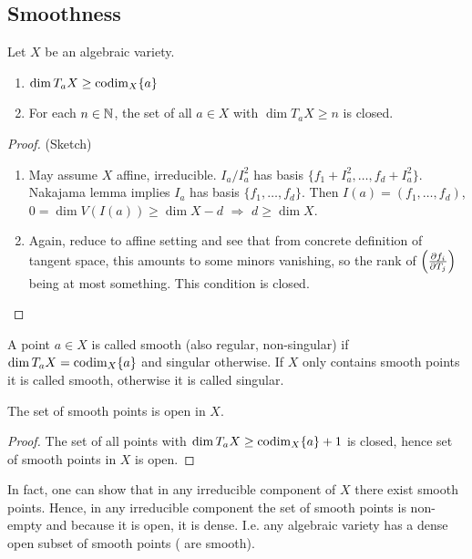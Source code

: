 \documentclass[a4paper,11pt]{article}
\begin{document}
		\subsection{Smoothness}

			\begin{prop}\label{prop--smoothness}
				Let $X$ be an algebraic variety.
				\begin{enumerate}
					\item $\dim T_aX\ge\operatorname{codim}_X\{a\}$
					\item For each $n\in\mathbb{N}$, the set of all $a\in X$ with $\dim T_aX\ge n$ is closed.
				\end{enumerate}
			\end{prop}
			\begin{proof}
				(Sketch)
				\begin{enumerate}
					\item May assume $X$ affine, irreducible. $I_a/I_a^2$ has basis $\{f_1+I_a^2,\dots,f_d+I_a^2\}$. Nakajama lemma implies $I_a$ has basis $\{f_1,\dots,f_d\}$. Then $I(a)=(f_1,\dots,f_d)$, $0=\dim V(I(a))\ge\dim X-d$ $\Longrightarrow$ $d\ge\dim X$.
					\item Again, reduce to affine setting and see that from concrete definition of tangent space, this amounts to some minors vanishing, so the rank of $\left(\frac{\partial f_i}{\partial T_j}\right)$ being at most something. This condition is closed.
				\end{enumerate}
			\end{proof}

			\begin{defi}
				A point $a\in X$ is called smooth (also regular, non-singular) if $\dim T_aX=\operatorname{codim}_X\{a\}$ and singular otherwise. If $X$ only contains smooth points it is called smooth, otherwise it is called singular. 
			\end{defi}

			\begin{cor}
				The set of smooth points is open in $X$.
			\end{cor}
			\begin{proof}
				The set of all points with $\dim T_aX\ge\operatorname{codim}_X\{a\}+1$ is closed, hence set of smooth points in $X$ is open.
			\end{proof}

			In fact, one can show that in any irreducible component of $X$ there exist smooth points. Hence, in any irreducible component the set of smooth points is non-empty and because it is open, it is dense. I.e. any algebraic variety has a dense open subset of smooth points ( are smooth).
\end{document}
